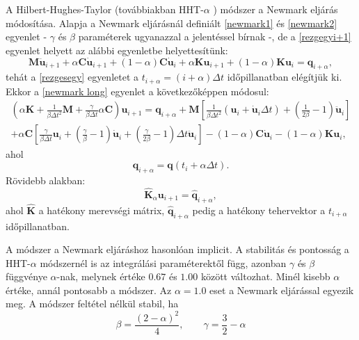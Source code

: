 A Hilbert-Hughes-Taylor (továbbiakban HHT-$\alpha$ \cite{hht, hht_wiki}) módszer a Newmark eljárás módosítása. Alapja a Newmark eljárásnál definiált \eqref{newmark1} és \eqref{newmark2} egyenlet - $\gamma$ és $\beta$ paraméterek ugyanazzal a jelentéssel bírnak -, de a \eqref{rezgegyi+1} egyenlet helyett az alábbi egyenletbe helyettesítünk:
\begin{equation}
\mathbf{M}\mathbf{\ddot{u}}_{i+1}+\alpha\mathbf{C}\mathbf{\dot{u}}_{i+1}+(1-\alpha)\mathbf{C}\mathbf{\dot{u}}_{i}+\alpha\mathbf{K}\mathbf{u}_{i+1}+(1-\alpha)\mathbf{K}\mathbf{u}_i=\mathbf{q}_{i+\alpha},
\end{equation}
tehát a \eqref{rezgesegy} egyenletet a $t_{i+\alpha} = (i+\alpha)\Delta{t}$ időpillanatban elégítjük ki.
Ekkor a \eqref{newmark long} egyenlet a következőképpen módosul:
\begin{equation}
\label{hht long}
\begin{split}
\left(\alpha\mathbf{K}+\frac{1}{\beta\Delta{t}^2}\mathbf{M}+\frac{\gamma}{\beta\Delta{t}}\alpha\mathbf{C}\right)\mathbf{u}_{i+1} = \mathbf{q}_{i+\alpha}+\mathbf{M}\left[\frac{1}{\beta\Delta{t}^2}\left(\mathbf{u}_i+\mathbf{\dot{u}}_i\Delta{t}\right)+\left( \frac{1}{2\beta}-1\right)\mathbf{\ddot{u}}_i\right]        \\ +\alpha\mathbf{C}\left[\frac{\gamma}{\beta\Delta{t}}\mathbf{u}_i+\left(\frac{\gamma}{\beta}-1\right)\mathbf{\dot{u}}_i+\left(\frac{\gamma}{2\beta}-1\right)\Delta{t}\mathbf{\ddot{u}}_i\right]-(1-\alpha)\mathbf{C}\mathbf{\dot{u}}_i-(1-\alpha)\mathbf{K}\mathbf{u}_i,
\end{split}
\end{equation}
ahol
\begin{equation*}
\mathbf{q}_{i+\alpha} = \mathbf{q}(t_i+\alpha\Delta{t}).
\end{equation*}
%
Rövidebb alakban:
\begin{equation}
\label{hht short}
\mathbf{\hat{K}}_{\alpha}\mathbf{u}_{i+1} = \mathbf{\hat{q}}_{i+\alpha},
\end{equation}
ahol $\mathbf{\hat{K}}$ a hatékony merevségi mátrix, $\mathbf{\hat{q}}_{i+\alpha}$ pedig a hatékony tehervektor a $t_{i+\alpha}$ időpillanatban.


A módszer a Newmark eljáráshoz hasonlóan implicit. A stabilitás és pontosság a HHT-$\alpha$ módszernél is az integrálási paraméterektől függ, azonban $\gamma$ és $\beta$ függvénye $\alpha$-nak, melynek értéke $0.67$ és $1.00$ között változhat. Minél kisebb $\alpha$ értéke, annál pontosabb a módszer. Az $\alpha=1.0$ eset a Newmark eljárással egyezik meg. A módszer feltétel nélkül stabil, ha
\begin{equation*}
\beta = \frac{(2-\alpha)^2}{4}, \qquad \gamma = \frac{3}{2}-\alpha
 \end{equation*}

